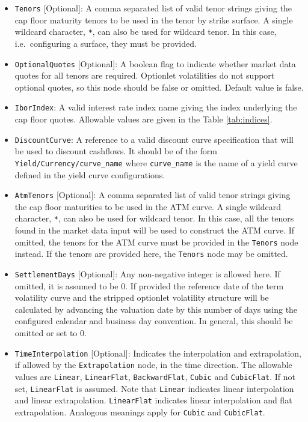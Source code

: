 \begin{itemize}
\item \lstinline!Tenors! [Optional]:
A comma separated list of valid tenor strings giving the cap floor maturity tenors to be used in the tenor by strike surface. A single wildcard character, \lstinline!*!, can also be used for wildcard tenor. In this case, i.e.\ configuring a surface, they must be provided.

\item \lstinline!OptionalQuotes! [Optional]:
A boolean flag to indicate whether market data quotes for all tenors are required. Optionlet volatilities do not support optional quotes, so this node should be false or omitted. Default value is false.

\item \lstinline!IborIndex!:
A valid interest rate index name giving the index underlying the cap floor quotes. Allowable values are given in the Table \ref{tab:indices}.

\item \lstinline!DiscountCurve!:
A reference to a valid discount curve specification that will be used to discount cashflows. It should be of the form \lstinline!Yield/Currency/curve_name! where \lstinline!curve_name! is the name of a yield curve defined in the yield curve configurations.

\item \lstinline!AtmTenors! [Optional]:
A comma separated list of valid tenor strings giving the cap floor maturities to be used in the ATM curve. A single wildcard character, \lstinline!*!, can also be used for wildcard tenor. In this case, all the tenors found in the market data input will be used to construct the ATM curve. If omitted, the tenors for the ATM curve must be provided in the \lstinline!Tenors! node instead. If the tenors are provided here, the \lstinline!Tenors! node may be omitted.

\item \lstinline!SettlementDays! [Optional]:
Any non-negative integer is allowed here. If omitted, it is assumed to be 0. If provided the reference date of the term volatility curve and the stripped optionlet volatility structure will be calculated by advancing the valuation date by this number of days using the configured calendar and business day convention. In general, this should be omitted or set to 0.

\item \lstinline!TimeInterpolation! [Optional]:
Indicates the interpolation and extrapolation, if allowed by the \lstinline!Extrapolation! node, in the time direction. The allowable values are \lstinline!Linear!, \lstinline!LinearFlat!, \lstinline!BackwardFlat!, \lstinline!Cubic! and \lstinline!CubicFlat!. If not set, \lstinline!LinearFlat! is assumed. Note that \lstinline!Linear! indicates linear interpolation and linear extrapolation. \lstinline!LinearFlat! indicates linear interpolation and flat extrapolation. Analogous meanings apply for \lstinline!Cubic! and \lstinline!CubicFlat!.


\end{itemize}
